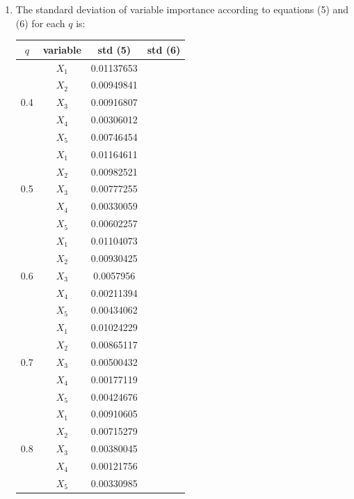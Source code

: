 \documentclass[paper=letter, fontsize=12pt]{article}
\begin{document}
\begin{enumerate}[label=(\alph*)]
\begin{enumerate}[label=(\roman*)]
		\item The standard deviation of variable importance according to equations (5) and (6) for each $q$ is:
		
		\begin{longtable}{|c|c|c|c|}
			\hline
			$q$ & variable & std (5) & std (6) \\ \hline
			\multirow{5}{1em}{0.4} & $X_1$ & 0.01137653 & \\ 
			& $X_2$ & 0.00949841 & \\
			& $X_3$ & 0.00916807 & \\
			& $X_4$ & 0.00306012 & \\
			& $X_5$ & 0.00746454 & \\
			\hline
			\multirow{5}{1em}{0.5} & $X_1$ & 0.01164611 & \\ 
			& $X_2$ & 0.00982521 & \\
			& $X_3$ & 0.00777255 & \\
			& $X_4$ & 0.00330059 & \\
			& $X_5$ & 0.00602257 & \\
			\hline
			\multirow{5}{1em}{0.6} & $X_1$ & 0.01104073 & \\ 
			& $X_2$ & 0.00930425 & \\
			& $X_3$ & 0.0057956 & \\
			& $X_4$ & 0.00211394 & \\
			& $X_5$ & 0.00434062 & \\
			\hline
			\multirow{5}{1em}{0.7} & $X_1$ & 0.01024229 & \\ 
			& $X_2$ & 0.00865117 & \\
			& $X_3$ & 0.00500432 & \\
			& $X_4$ & 0.00177119 & \\
			& $X_5$ & 0.00424676 & \\
			\hline
			\multirow{5}{1em}{0.8} & $X_1$ & 0.00910605 & \\ 
			& $X_2$ & 0.00715279 & \\
			& $X_3$ & 0.00380045 &\\
			& $X_4$ & 0.00121756 & \\
			& $X_5$ & 0.00330985 & \\
			\hline
		\end{longtable}
	\end{enumerate}
\end{enumerate}
\end{document}
